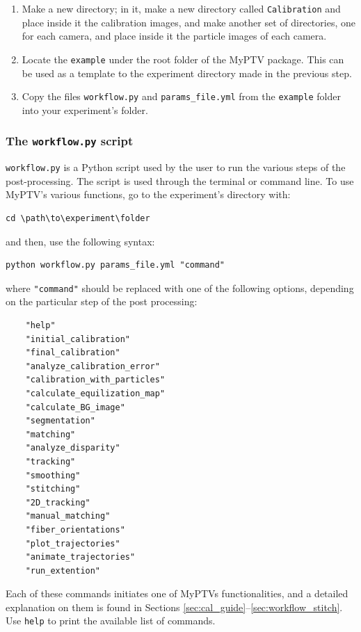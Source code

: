 \documentclass[10pt,a4paper]{article}
\begin{document}
\begin{enumerate}
	\item Make a new directory; in it, make a new directory called \texttt{Calibration} and place inside it the calibration images, and make another set of directories, one for each camera, and place inside it the particle images of each camera.
	\item Locate the \texttt{example} under the root folder of the MyPTV package. This can be used as a template to the experiment directory made in the previous step.
	\item Copy the files \texttt{workflow.py} and \texttt{params\_file.yml} from the \texttt{example} folder into your experiment's folder.
\end{enumerate}




\subsubsection{The \texttt{workflow.py} script} \label{sec:workflow_commands}

\texttt{workflow.py} is a Python script used by the user to run the various steps of the post-processing. The script is used through the terminal or command line. To use MyPTV's various functions, go to the experiment's directory with:
\begin{verbatim}
cd \path\to\experiment\folder
\end{verbatim}
%
and then, use the following syntax:
%
\begin{verbatim}
python workflow.py params_file.yml "command"
\end{verbatim}
%
where \texttt{"command"} should be replaced with one of the following options, depending on the particular step of the post processing:
%
\begin{verbatim}
	"help"
	"initial_calibration"
	"final_calibration"
	"analyze_calibration_error"
	"calibration_with_particles"
	"calculate_equilization_map"
	"calculate_BG_image"
	"segmentation"
	"matching"
	"analyze_disparity"
	"tracking"
	"smoothing"
	"stitching"
	"2D_tracking"
	"manual_matching"
	"fiber_orientations"
	"plot_trajectories"
	"animate_trajectories"
	"run_extention"
\end{verbatim}
%
Each of these commands initiates one of MyPTVs functionalities, and a detailed explanation on them is found in Sections \ref{sec:cal_guide}--\ref{sec:workflow_stitch}. Use \texttt{help} to print the available list of commands.
\end{document}

